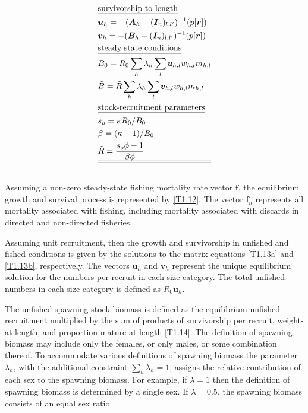 \documentclass[12pt,letterpaper]{article}
\newcounter{saveEq}
\def\getEq{\setcounter{equation}{\value{saveEq}}}
\def\normalEq{ %
    \getEq
    \renewcommand{\theequation}{\arabic{section}.\arabic{equation}}}
\begin{document}
\begin{table}
\begin{align}
    &\mbox{\underline{survivorship to length}} \nonumber \\
    & \bm{u}_h   = -(\bm{A}_h - (\bm{I}_n)_{l,l'})^{-1} (p[\bm{r}]) \label{T1.13a}\\
    & \bm{v}_h   = -(\bm{B}_h - (\bm{I}_n)_{l,l'})^{-1} (p[\bm{r}]) \label{T1.13b}\\
    &\mbox{\underline{steady-state conditions}}\nonumber \\
    & B_0 = R_0 \sum_h \lambda_h \sum_l \pmb{u}_{h,l} w_{h,l} m_{h,l} \label{T1.14}\\
    & \tilde{B} = \tilde{R}\sum_h \lambda_h \sum_l \pmb{v}_{h,l} w_{h,l} m_{h,l} \label{T1.16}\\
    &\mbox{\underline{stock-recruitment parameters}}\nonumber\\
    &s_o = \kappa R_0 / B_0 \label{T1.17}\\
    &\beta = (\kappa -1)/B_0 \label{T1.18}\\
    &\tilde{R} = \frac{s_o \phi -1}{\beta \phi} \label{T1.19}\\
    \hline \hline \nonumber
  \end{align}
\normalEq
\end{table}

    Assuming a non-zero steady-state fishing mortality rate vector $\pmb{f}$, the equilibrium growth and survival process is represented by \eqref{T1.12}.  The vector $\bm{f}_h$ represents all mortality associated with fishing, including mortality associated with discards in directed and non-directed fisheries.

    Assuming unit recruitment, then the growth and survivorship in unfished and fished conditions is given by the solutions to the matrix equations \eqref{T1.13a} and \eqref{T1.13b}, respectively.   The vectors $\bm{u}_h$ and $\bm{v}_h$ represent the unique equilibrium solution for the numbers per recruit in each size category.  The total unfished numbers in each size category is defined as $R_0 \bm{u}_h$.

    The unfished spawning stock biomass is defined as the equilibrium unfished recruitment multiplied by the sum of products of survivorship per recruit, weight-at-length, and proportion mature-at-length \eqref{T1.14}.  The definition of spawning  biomass may include only the females, or only males, or some combination thereof. To accommodate various definitions of spawning biomass the parameter $\lambda_h$, with the additional constraint $\sum_h \lambda_h = 1$, assigns the relative contribution of each sex to the spawning biomass.  For example, if $\lambda = 1$  then the definition of spawning biomass is determined by a single sex. If $\lambda = 0.5$, the spawning biomass consists of an equal sex ratio.
\end{document}
